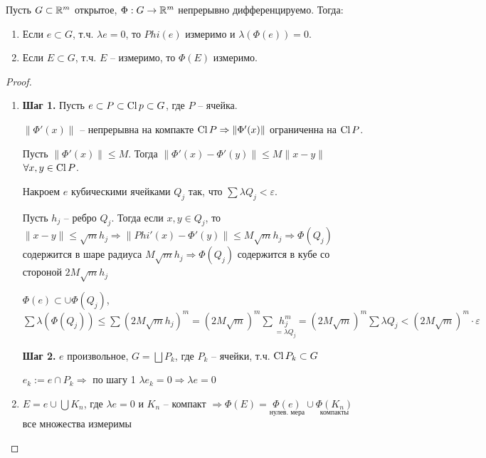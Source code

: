 \begin{theorem}
    Пусть $G\subset \mathbb{R}^m$ открытое, $\Phi : G\rightarrow \mathbb{R}^m$ непрерывно дифференцируемо. Тогда:
    \begin{enumerate}
        \item Если $e\subset G$, т.ч. $\lambda e=0$, то $Phi(e)$ измеримо и $\lambda (\Phi(e)) =0$.
        \item Если $E\subset G$, т.ч. $E$ – измеримо, то $\Phi(E)$ измеримо.
    \end{enumerate}
\end{theorem}

\begin{proof}~
    \begin{enumerate}
        \item \textbf{Шаг 1.} Пусть $e\subset P\subset \operatorname{Cl} p\subset G$, где $P$ – ячейка.
        
        $\|\Phi'(x)\|$ – непрерывна на компакте $\operatorname{Cl} P\Rightarrow \|\Phi'(x)\|$ ограниченна
        на $\operatorname{Cl} P$. 
        
        Пусть $\|\Phi'(x)\|\leq M$. Тогда $\|\Phi'(x)-\Phi'(y)\|\leq M\|x-y\|$ $\forall x, y\in \operatorname{Cl} P$.

        Накроем $e$ кубическими ячейками $Q_j$ так, что $\sum \lambda Q_j<\varepsilon$.

        Пусть $h_j$ – ребро $Q_j$. Тогда если $x, y\in Q_j$, то $\|x - y\|\leq \sqrt{m}h_j\Rightarrow
        \|Phi'(x)-\Phi'(y)\|\leq M\sqrt{m}h_j\Rightarrow \Phi(Q_j)$ содержится в шаре радиуса $M\sqrt{m}h_j\Rightarrow
        \Phi(Q_j)$ содержится в кубе со стороной $2M\sqrt{m}h_j$

        $\Phi(e)\subset \cup\Phi(Q_j)$, $\sum \lambda (\Phi(Q_j))\leq \sum (2M\sqrt{m}h_j)^m=(2M\sqrt{m})^m 
        \sum \underset{=\lambda Q_j}{h_j^m}=(2M\sqrt{m})^m \sum \lambda Q_j<(2M\sqrt{m})^m\cdot \varepsilon$

        \textbf{Шаг 2.} $e$ произвольное, $G=\bigsqcup P_k$, где $P_k$ – ячейки, т.ч. $\operatorname{Cl} P_k\subset G$

        $e_k:=e\cap P_k\Rightarrow$ по шагу 1 $\lambda e_k=0\Rightarrow \lambda e=0$

        \item $E=e\cup \bigcup K_n$, где $\lambda e=0$ и $K_n$ – компакт $\Rightarrow\Phi(E)=
        \underset{\text{нулев. мера}}{\Phi(e)}\cup \underset{\text{компакты}}{\Phi(K_n)}$ все множества измеримы
    \end{enumerate}
\end{proof}

